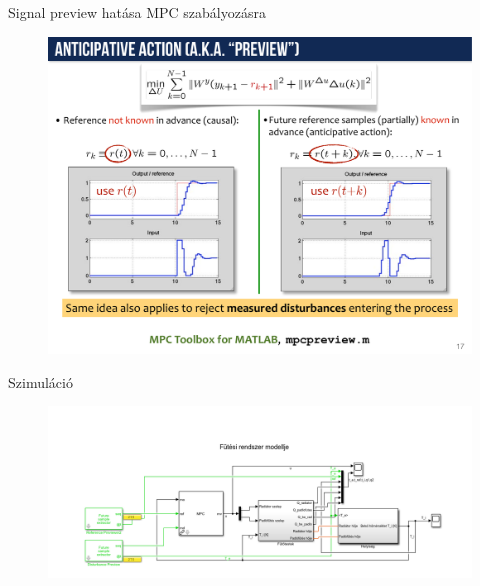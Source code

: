 \documentclass[14pt,handout]{beamer}
\begin{document}
\begin{frame}{Signal preview hatása MPC szabályozásra}
\begin{figure}[H]
	\centering
	\includegraphics[trim=10 50 10 0, clip,width=\textwidth]{figures/onlab/preview}
\end{figure}
\end{frame}


\begin{frame}{Szimuláció}
\begin{figure}[H]
	\centering
	\includegraphics[trim=70 0 65 0, clip,width=\textwidth]{figures/onlab/comparepng}
\end{figure}
\end{frame}
\end{document}
